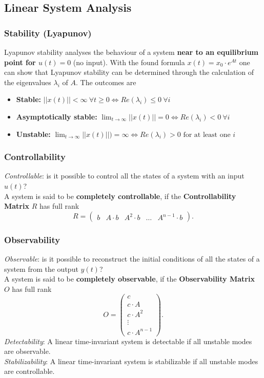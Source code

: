 \documentclass[a4paper,12 pt]{article}
\numberwithin{equation}{section}
\theoremstyle{definition}
\theoremstyle{remark}
\theoremstyle{definition}
\theoremstyle{definition}
\theoremstyle{definition}
\theoremstyle{remark}
\begin{document}
  \subsection{Linear System Analysis}
  \subsubsection{Stability (Lyapunov)}
  Lyapunov stability analyses the behaviour of a system \textbf{near to an equilibrium point for $u(t)=0$} (no input). With the found formula $x(t)=x_0\cdot e^{At}$ one can show that Lyapunov stability can be determined through the calculation of the eigenvalues $\lambda_i$ of $A$. The outcomes are
  
  \begin{itemize}
  \item \textbf{Stable:} $||x(t)||<\infty \ \forall t\geq 0 \Leftrightarrow Re(\lambda_i) \leq 0 \ \forall i$
  \item \textbf{Asymptotically stable:} $\lim_{t\rightarrow \infty}||x(t)||=0 \Leftrightarrow Re(\lambda_i) <0 \ \forall i$
  \item \textbf{Unstable:} $\lim_{t\rightarrow \infty}||x(t)||)=\infty \Leftrightarrow Re(\lambda_i)>0 \text{ for at least one }i$
  \end{itemize}
  
  \subsubsection{Controllability}
  \textit{Controllable}: is it possible to control all the states of a system with an input $u(t)$? \\
A system is said to be \textbf{completely controllable}, if the \textbf{Controllability Matrix} $R$ has full rank
 \begin{equation}R=\begin{pmatrix} b & A\cdot b &A^2\cdot b &\hdots &A^{n-1} \cdot b \end{pmatrix}.\end{equation}
  
  \subsubsection{Observability}
  \textit{Observable}: is it possible to reconstruct the initial conditions of all the states of a system from the output $y(t)$? \\
A system is said to be \textbf{completely observable}, if the \textbf{Observability Matrix} $O$ has full rank
  \begin{equation}O=\begin{pmatrix} c \\ c\cdot A \\ c\cdot A^2 \\ \vdots \\ c\cdot A^{n-1} \end{pmatrix}.\end{equation}
\textit{Detectability}: A linear time-invariant system is detectable if all unstable modes are observable.\\
\textit{Stabilizability}: A linear time-invariant system is stabilizable if all unstable modes are controllable.
\newpage
\end{document}
